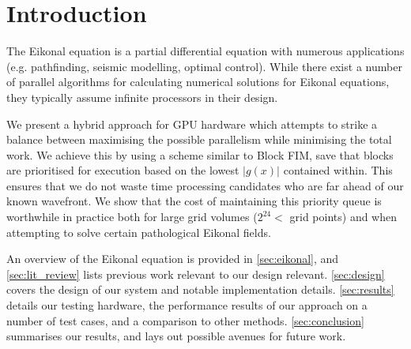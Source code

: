 \documentclass[11pt]{article}       %
\begin{document}
\section{Introduction} \label{sec:intro}

The Eikonal equation is a partial differential equation with numerous applications (e.g. pathfinding, seismic modelling, optimal control). While there exist a number of parallel algorithms for calculating numerical solutions for Eikonal equations, they typically assume infinite processors in their design.

We present a hybrid approach for GPU hardware which attempts to strike a balance between maximising the possible parallelism while minimising the total work. We achieve this by using a scheme similar to Block FIM\cite{jeong2008fast}, save that blocks are prioritised for execution based on the lowest $|g(x)|$ contained within. This ensures that we do not waste time processing candidates who are far ahead of our known wavefront. We show that the cost of maintaining this priority queue is worthwhile in practice both for large grid volumes ($2^{24} < $ grid points) and when attempting to solve certain pathological Eikonal fields.

An overview of the Eikonal equation is provided in \autoref{sec:eikonal}, and \autoref{sec:lit_review} lists previous work relevant to our design relevant.
\autoref{sec:design} covers the design of our system and notable implementation details. \autoref{sec:results} details our testing hardware, the performance results of our approach on a number of test cases, and a comparison to other methods. \autoref{sec:conclusion} summarises our results, and lays out possible avenues for future work.

\end{document}
